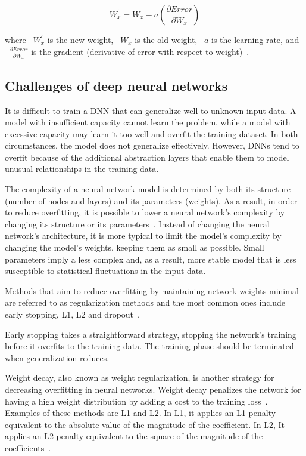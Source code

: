 \begin{equation}\label{eq:4}
    W_{x}^{'} = W_{x} - a(\frac{\partial Error}{\partial W_{x}})
\end{equation}

where ~$W_{x}^{'}$ is the new weight, ~$W_{x}$ is the old weight, ~$a$ is the learning rate, and ~$\frac{\partial Error}{\partial W_{x}}$ is the gradient (derivative of error with respect to weight)~\cite{Kim2021EasyAlgorithm}.

\subsection{Challenges of deep neural networks}

It is difficult to train a \gls{DNN} that can generalize well to unknown input data. A model with insufficient capacity cannot learn the problem, while a model with excessive capacity may learn it too well and overfit the training dataset. In both circumstances, the model does not generalize effectively. However, \gls{DNN}s tend to overfit because of the additional abstraction layers that enable them to model unusual relationships in the training data.

The complexity of a neural network model is determined by both its structure (number of nodes and layers) and its parameters (weights). As a result, in order to reduce overfitting, it is possible to lower a neural network's complexity by changing its structure or its parameters~\cite{Brownlee2019HowNetworks}. Instead of changing the neural network's architecture, it is more typical to limit the model's complexity by changing the model's weights, keeping them as small as possible. Small parameters imply a less complex and, as a result, more stable model that is less susceptible to statistical fluctuations in the input data.

Methods that aim to reduce overfitting by maintaining network weights minimal are referred to as regularization methods and the most common ones include early stopping, L1, L2 and dropout~\cite{Brownlee2019HowNetworks}.

Early stopping takes a straightforward strategy, stopping the network's training before it overfits to the training data. The training phase should be terminated when generalization reduces.

Weight decay, also known as weight regularization, is another strategy for decreasing overfitting in neural networks. Weight decay penalizes the network for having a high weight distribution by adding a cost to the training loss~\cite{Brownlee2019HowNetworks}. Examples of these methods are L1 and L2. In L1, it applies an L1 penalty equivalent to the absolute value of the magnitude of the coefficient. In L2, It applies an L2 penalty equivalent to the square of the magnitude of the coefficients~\cite{NgFeatureInvariance}.

